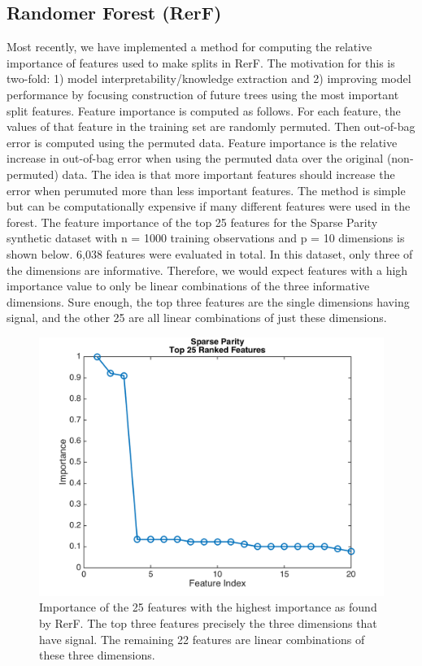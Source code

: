 \documentclass[simplex.tex]{subfiles}
\begin{document}
\subsection[Randomer Forest]{Randomer Forest (RerF)}

Most recently, we have implemented a method for computing the relative importance of features used to make splits in RerF. The motivation for this is two-fold: 1) model interpretability/knowledge extraction and 2) improving model performance by focusing construction of future trees using the most important split features. Feature importance is computed as follows. For each feature, the values of that feature in the training set are randomly permuted. Then out-of-bag error is computed using the permuted data. Feature importance is the relative increase in out-of-bag error when using the permuted data over the original (non-permuted) data. The idea is that more important features should increase the error when perumuted more than less important features. The method is simple but can be computationally expensive if many different features were used in the forest. The feature importance of the top 25 features for the Sparse Parity synthetic dataset with n = 1000 training observations and p = 10 dimensions is shown below. 6,038 features were evaluated in total. In this dataset, only three of the dimensions are informative. Therefore, we would expect features with a high importance value to only be linear combinations of the three informative dimensions. Sure enough, the top three features are the single dimensions having signal, and the other 25 are all linear combinations of just these dimensions. 

\begin{figure}[h!]
\begin{cframed}
\centering
\includegraphics[height=0.33\textheight]{../../figs/Sparse_parity_feature_importance_2017_05_27.png}
\caption{
Importance of the 25 features with the highest importance as found by RerF. The top three features precisely the three dimensions that have signal. The remaining 22 features are linear combinations of these three dimensions.
}
\label{fig:RefF3}
\end{cframed}
\end{figure}
\end{document}
